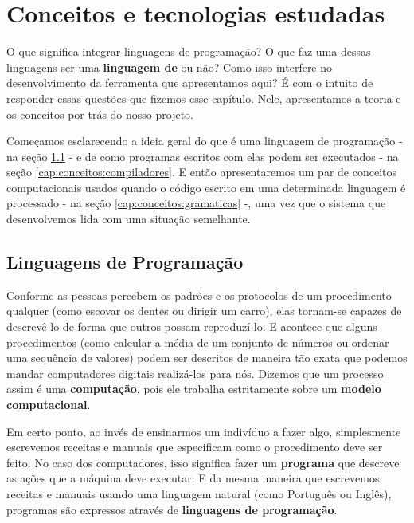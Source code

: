 
\chapter{Conceitos e tecnologias estudadas}
\label{cap:conceitos}

  O que significa integrar linguagens de programação? O que faz uma dessas
  linguagens ser uma \textbf{linguagem de \script{}} ou não? Como isso interfere
  no desenvolvimento da ferramenta que apresentamos aqui? É com o intuito de
  responder essas questões que fizemos esse capítulo. Nele, apresentamos a
  teoria e os conceitos por trás do nosso projeto.

  Começamos esclarecendo a ideia geral do que é uma linguagem de programação -
  na seção \ref{cap:conceitos:linguagens} - e de como programas escritos com
  elas podem ser executados - na seção \ref{cap:conceitos:compiladores}.
  E então apresentaremos um par de conceitos computacionais usados
  quando o código escrito em uma determinada linguagem é processado - na seção
  \ref{cap:conceitos:gramaticas} -, uma vez que o sistema que desenvolvemos lida
  com uma situação semelhante.

  \section{Linguagens de Programação}
  \label{cap:conceitos:linguagens}

  Conforme as pessoas percebem os padrões e os protocolos de um procedimento
  qualquer (como escovar os dentes ou dirigir um carro), elas tornam-se capazes
  de descrevê-lo de forma que outros possam reproduzí-lo. E acontece que alguns
  procedimentos (como calcular a média de um conjunto de números ou ordenar uma
  sequência de valores) podem ser descritos de maneira tão exata que podemos
  mandar computadores digitais realizá-los para nós. Dizemos que um processo
  assim é uma \textbf{computação}, pois ele trabalha estritamente sobre um
  \textbf{modelo computacional}.
  
  Em certo ponto, ao invés de ensinarmos um indivíduo a fazer algo, simplesmente
  escrevemos receitas e manuais que especificam como o procedimento deve ser
  feito. No caso dos computadores, isso significa fazer um \textbf{programa}
  que descreve as ações que a máquina deve executar. E da mesma maneira que
  escrevemos receitas e manuais usando uma linguagem natural (como Português ou
  Inglês), programas são expressos através de \textbf{linguagens de
  programação}.

